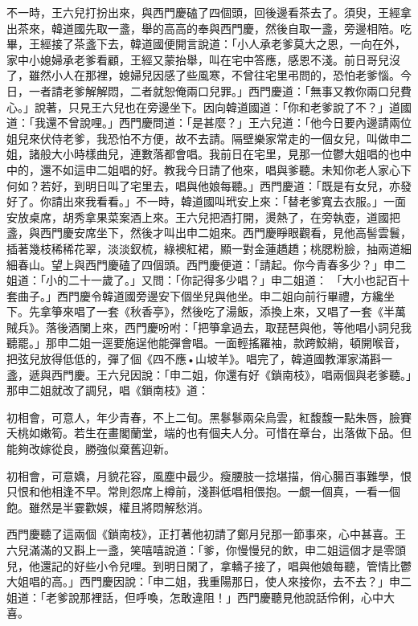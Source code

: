不一時，王六兒打扮出來，與西門慶磕了四個頭，回後邊看茶去了。須臾，王經拿出茶來，韓道國先取一盞，舉的高高的奉與西門慶，然後自取一盞，旁邊相陪。吃畢，王經接了茶盞下去，韓道國便開言說道：「小人承老爹莫大之恩，一向在外，家中小媳婦承老爹看顧，王經又蒙抬舉，叫在宅中答應，感恩不淺。前日哥兒沒了，雖然小人在那裡，媳婦兒因感了些風寒，不曾往宅里弔問的，恐怕老爹惱。今日，一者請老爹解解悶，二者就恕俺兩口兒罪。」西門慶道：「無事又教你兩口兒費心。」說著，只見王六兒也在旁邊坐下。因向韓道國道：「你和老爹說了不？」道國道：「我還不曾說哩。」西門慶問道：「是甚麼？」王六兒道：「他今日要內邊請兩位姐兒來伏侍老爹，我恐怕不方便，故不去請。隔壁樂家常走的一個女兒，叫做申二姐，諸般大小時樣曲兒，連數落都會唱。我前日在宅里，見那一位鬱大姐唱的也中中的，還不如這申二姐唱的好。教我今日請了他來，唱與爹聽。未知你老人家心下何如？若好，到明日叫了宅里去，唱與他娘每聽。」西門慶道：「既是有女兒，亦發好了。你請出來我看看。」不一時，韓道國叫玳安上來：「替老爹寬去衣服。」一面安放桌席，胡秀拿果菜案酒上來。王六兒把酒打開，燙熱了，在旁執壺，道國把盞，與西門慶安席坐下，然後才叫出申二姐來。西門慶睜眼觀看，見他高髻雲鬟，插著幾枝稀稀花翠，淡淡釵梳，綠襖紅裙，顯一對金蓮趫趫；桃腮粉臉，抽兩道細細春山。望上與西門慶磕了四個頭。西門慶便道：「請起。你今青春多少？」申二姐道：「小的二十一歲了。」又問：「你記得多少唱？」申二姐道： 「大小也記百十套曲子。」西門慶令韓道國旁邊安下個坐兒與他坐。申二姐向前行畢禮，方纔坐下。先拿箏來唱了一套《秋香亭》，然後吃了湯飯，添換上來，又唱了一套《半萬賊兵》。落後酒闌上來，西門慶吩咐：「把箏拿過去，取琵琶與他，等他唱小詞兒我聽罷。」那申二姐一逕要施逞他能彈會唱。一面輕搖羅袖，款跨鮫綃，頓開喉音，把弦兒放得低低的，彈了個《四不應•山坡羊》。唱完了，韓道國教渾家滿斟一盞，遞與西門慶。王六兒因說：「申二姐，你還有好《鎖南枝》，唱兩個與老爹聽。」那申二姐就改了調兒，唱《鎖南枝》道：

初相會，可意人，年少青春，不上二旬。黑鬖鬖兩朵烏雲，紅馥馥一點朱唇，臉賽夭桃如嫩筍。若生在畫閣蘭堂，端的也有個夫人分。可惜在章台，出落做下品。但能夠改嫁從良，勝強似棄舊迎新。

初相會，可意嬌，月貌花容，風塵中最少。瘦腰肢一捻堪描，俏心腸百事難學，恨只恨和他相逢不早。常則怨席上樽前，淺斟低唱相偎抱。一覷一個真，一看一個飽。雖然是半霎歡娛，權且將悶解愁消。

西門慶聽了這兩個《鎖南枝》，正打著他初請了鄭月兒那一節事來，心中甚喜。王六兒滿滿的又斟上一盞，笑嘻嘻說道：「爹，你慢慢兒的飲，申二姐這個才是零頭兒，他還記的好些小令兒哩。到明日閑了，拿轎子接了，唱與他娘每聽，管情比鬱大姐唱的高。」西門慶因說：「申二姐，我重陽那日，使人來接你，去不去？」申二姐道：「老爹說那裡話，但呼喚，怎敢違阻！」西門慶聽見他說話伶俐，心中大喜。

